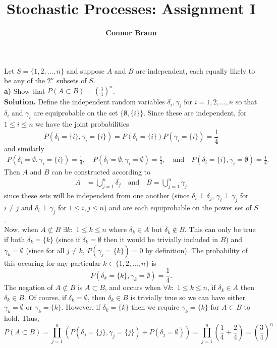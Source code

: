 \documentclass[11pt, letterpaper]{article}
\title{\bf Stochastic Processes: Assignment I}
\author{\bf Connor Braun}
\date{}
\begin{document}
    \maketitle
     Let $S=\{1,2,\dots,n\}$ and suppose $A$ and $B$ are independent, each equally likely to be any of the $2^n$ subsets of $S$.\\[10pt]
    {\bf a)} Show that $P(A\subset B)=\left(\frac{3}{4}\right)^n$.\\[10pt]
    {\bf Solution.} Define the independent random variables $\delta_i,\gamma_i$ for $i=1,2,\dots,n$ so that $\delta_i$ and $\gamma_i$ are equiprobable on the set $\{\emptyset, \{i\}\}$. Since these are independent, for $1\leq i\leq n$ we have the joint probabilities
    \[P(\delta_i=\{i\},\gamma_i=\{i\})=P(\delta_i=\{i\})P(\gamma_i=\{i\})=\frac{1}{4}\]
    and similarly
    \begin{align*}
        P(\delta_i=\emptyset,\gamma_i=\{i\})=\frac{1}{4},\quad
        P(\delta_i=\emptyset,\gamma_i=\emptyset)=\frac{1}{4},\quad\text{and}\quad
        P(\delta_i=\{i\},\gamma_i=\emptyset)=\frac{1}{4}.
    \end{align*}
    Then $A$ and $B$ can be constructed according to
    \begin{align*}
        A&=\bigcup_{j=1}^n\delta_j\quad\text{and}\quad B=\bigcup_{j=1}^n\gamma_j
    \end{align*}
    since these sets will be independent from one another (since $\delta_i\perp\delta_j$, $\gamma_i\perp\gamma_j$ for $i\neq j$ and $\delta_i\perp\gamma_j$ for $1\leq i,j\leq n$) and are each equiprobable on the power set of $S$.\\[10pt] 
    Now, when $A\not\subset B$ $\exists k:$ $1\leq k\leq n$ where $\delta_k\in A$ but $\delta_k\notin B$. This can only be true if both $\delta_k=\{k\}$ (since if $\delta_k=\emptyset$ then it would
    be trivially included in $B$) and $\gamma_k=\emptyset$ (since for all $j\neq k$, $P(\gamma_j=\{k\})=0$ by definition). The probability of this occuring for any particular $k\in\{1,2,\dots,n\}$ is
    \[P(\delta_k=\{k\},\gamma_k=\emptyset)=\frac{1}{4}.\]
    The negation of $A\not\subset B$ is $A\subset B$, and occurs when $\forall k:$ $1\leq k\leq n$, if $\delta_k\in A$ then $\delta_k\in B$. Of course, if $\delta_k=\emptyset$, then $\delta_k\in B$ is trivially true so we can have either $\gamma_k=\emptyset$ or $\gamma_k=\{k\}$. However, if $\delta_k=\{k\}$ then 
    we require $\gamma_k=\{k\}$ for $A\subset B$ to hold. Thus,
    \[P(A\subset B)=\prod_{j=1}^n\left(P(\delta_j=\{j\},\gamma_j=\{j\})+P(\delta_j=\emptyset)\right)=\prod_{j=1}^n\left(\frac{1}{4}+\frac{2}{4}\right)=\left(\frac{3}{4}\right)^n\]
\end{document}
